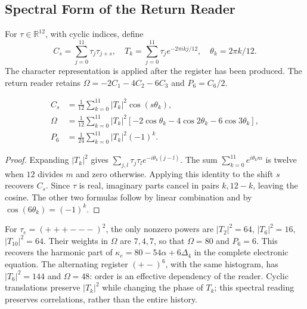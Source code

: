 \subsection{Spectral Form of the Return Reader}
For $\tau\in\mathbb R^{12}$, with cyclic indices, define
\begin{equation}
 C_s=\sum_{j=0}^{11}\tau_j\tau_{j+s},\quad
 T_k=\sum_{j=0}^{11}\tau_j e^{-2\pi i kj/12},\quad
 \theta_k=2\pi k/12.
 \label{md:r27:fourier}
\end{equation}
The character representation is applied after the register has been produced.
The return reader retains
$\Omega=-2C_1-4C_2-6C_3$ and $P_6=C_6/2$.
\begin{proposition}
\begin{equation}
 \begin{split}
 C_s&=\frac1{12}\sum_{k=0}^{11}|T_k|^2\cos(s\theta_k),\\
 \Omega&=\frac1{12}\sum_{k=0}^{11}|T_k|^2
 [-2\cos\theta_k-4\cos2\theta_k-6\cos3\theta_k],\\
 P_6&=\frac1{24}\sum_{k=0}^{11}|T_k|^2(-1)^k.
 \end{split}
 \label{md:r27:espectro}
\end{equation}
\end{proposition}
\begin{proof}
Expanding $|T_k|^2$ gives
$\sum_{j,l}\tau_j\tau_l e^{-i\theta_k(j-l)}$.
The sum $\sum_{k=0}^{11}e^{i\theta_km}$ is twelve when $12$ divides $m$
and zero otherwise. Applying this identity to the shift $s$ recovers $C_s$.
Since $\tau$ is real, imaginary parts cancel in pairs $k,12-k$, leaving the
cosine. The other two formulas follow by linear combination and by
$\cos(6\theta_k)=(-1)^k$.
\end{proof}
For $\tau_e=(+++---)^2$, the only nonzero powers are
$|T_2|^2=64$, $|T_6|^2=16$, $|T_{10}|^2=64$. Their weights in $\Omega$
are $7,4,7$, so that $\Omega=80$ and $P_6=6$.
This recovers the harmonic part of
$\kappa_e=80-54\alpha+6\Delta_4$ in the complete electronic equation.
The alternating register $(+-)^6$, with the same histogram, has
$|T_6|^2=144$ and $\Omega=48$: order is an effective dependency of the reader.
Cyclic translations preserve $|T_k|^2$ while changing the phase of $T_k$;
this spectral reading preserves correlations, rather than the entire history.

